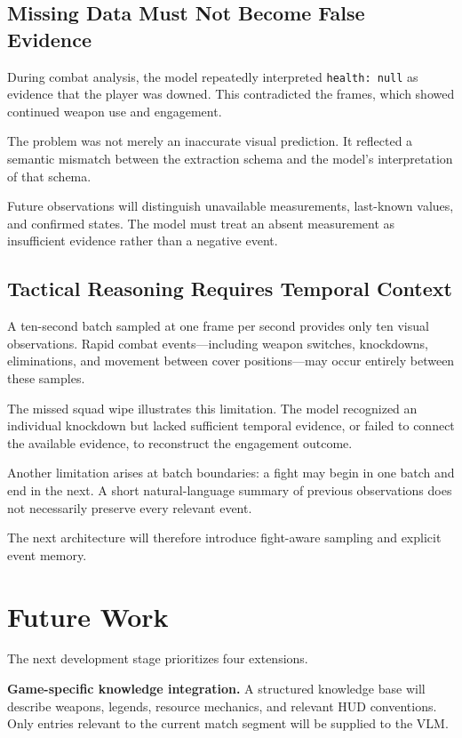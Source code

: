 \documentclass[10pt,letterpaper]{article}
\begin{document}
\subsection{Missing Data Must Not Become False Evidence}

During combat analysis, the model repeatedly interpreted
\texttt{health: null} as evidence that the player was
downed. This contradicted the frames, which showed
continued weapon use and engagement.

The problem was not merely an inaccurate visual
prediction. It reflected a semantic mismatch between
the extraction schema and the model's interpretation
of that schema.

Future observations will distinguish unavailable
measurements, last-known values, and confirmed states.
The model must treat an absent measurement as
insufficient evidence rather than a negative event.

\subsection{Tactical Reasoning Requires Temporal Context}

A ten-second batch sampled at one frame per second
provides only ten visual observations. Rapid combat
events---including weapon switches, knockdowns,
eliminations, and movement between cover positions---may
occur entirely between these samples.

The missed squad wipe illustrates this limitation.
The model recognized an individual knockdown but lacked
sufficient temporal evidence, or failed to connect the
available evidence, to reconstruct the engagement outcome.

Another limitation arises at batch boundaries: a fight
may begin in one batch and end in the next. A short
natural-language summary of previous observations does
not necessarily preserve every relevant event.

The next architecture will therefore introduce
fight-aware sampling and explicit event memory.

\section{Future Work}

The next development stage prioritizes four extensions.

\textbf{Game-specific knowledge integration.}
A structured knowledge base will describe weapons,
legends, resource mechanics, and relevant HUD conventions.
Only entries relevant to the current match segment
will be supplied to the VLM.
\end{document}
